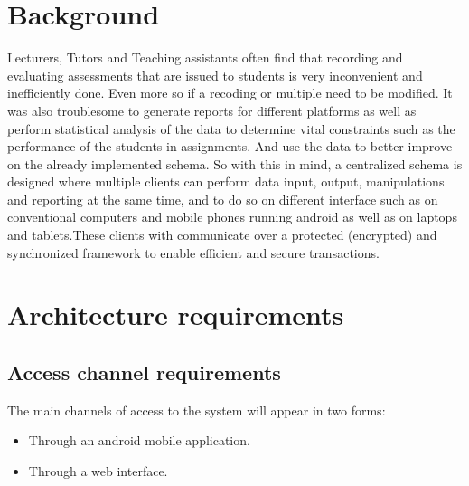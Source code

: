 \documentclass[10pt,a4paper]{article}
\begin{document}
\section{Background}
Lecturers, Tutors and Teaching assistants often find that recording and evaluating assessments that are issued to students is very inconvenient and inefficiently done. Even more so if a recoding or multiple need to be modified.\linebreak
It was also troublesome to generate reports for different platforms as well as perform statistical analysis of the data to determine vital constraints such as the performance of the students in assignments. And use the data to better improve on the already implemented schema.\linebreak
So with this in mind, a centralized schema is designed where multiple clients can perform data input, output, manipulations and reporting at the same time, and to do so on different interface such as on conventional computers and mobile phones running android as well as on laptops and tablets.\linebreak These clients with communicate over a protected (encrypted) and synchronized framework to enable efficient and secure transactions. 


\section{Architecture requirements}
\subsection{Access channel requirements}
	
The main channels of access to the system will appear in two forms:
\begin{itemize}
\item Through an android mobile application.
\item Through a web interface.
\end{itemize}
	
\end{document}
